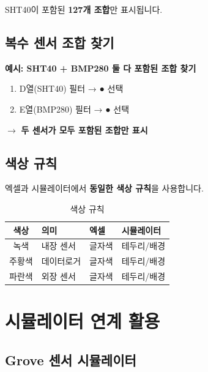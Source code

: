 \documentclass[11pt,a4paper]{article}
\begin{document}
\begin{tcolorbox}[tipbox, title={결과}]
SHT40이 포함된 \textbf{127개 조합}만 표시됩니다.
\end{tcolorbox}

\subsection{복수 센서 조합 찾기}

\textbf{예시: SHT40 + BMP280 둘 다 포함된 조합 찾기}

\begin{enumerate}
\item D열(SHT40) 필터 → ● 선택
\item E열(BMP280) 필터 → ● 선택
\end{enumerate}

$\rightarrow$ \textbf{두 센서가 모두 포함된 조합만 표시}

\subsection{색상 규칙}

엑셀과 시뮬레이터에서 \textbf{동일한 색상 규칙}을 사용합니다.

\begin{table}[H]
\centering
\begin{tabular}{|c|l|l|l|}
\hline
\rowcolor{tableheader}
\textbf{색상} & \textbf{의미} & \textbf{엑셀} & \textbf{시뮬레이터} \\
\hline
\cellcolor{greenbox} 녹색 & 내장 센서 & 글자색 & 테두리/배경 \\
\hline
\cellcolor{orangebox} 주황색 & 데이터로거 & 글자색 & 테두리/배경 \\
\hline
\cellcolor{bluebox} 파란색 & 외장 센서 & 글자색 & 테두리/배경 \\
\hline
\end{tabular}
\caption{색상 규칙}
\end{table}

\section{시뮬레이터 연계 활용}

\subsection{Grove 센서 시뮬레이터}
\end{document}
